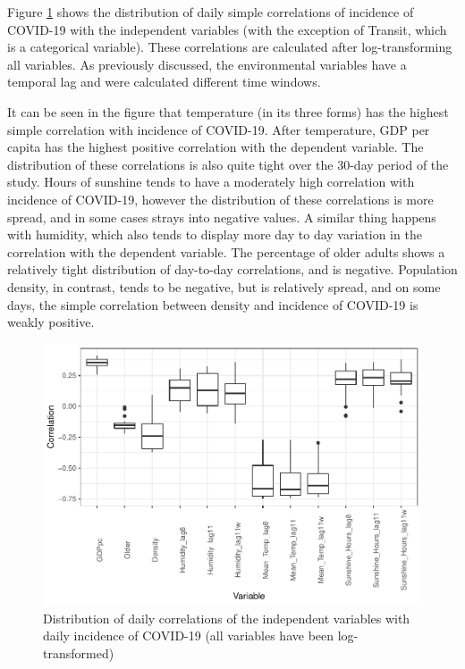 \documentclass[]{elsarticle} %
\makeatletter
\def\maxwidth{\ifdim\Gin@nat@width>\linewidth\linewidth
\else\Gin@nat@width\fi}
\let\Oldincludegraphics\includegraphics
\renewcommand{\includegraphics}[1]{\Oldincludegraphics[width=\maxwidth]{#1}}
\makeatother
\begin{document}
Figure \ref{fig:daily-correlations} shows the distribution of daily
simple correlations of incidence of COVID-19 with the independent
variables (with the exception of Transit, which is a categorical
variable). These correlations are calculated after log-transforming all
variables. As previously discussed, the environmental variables have a
temporal lag and were calculated different time windows.

It can be seen in the figure that temperature (in its three forms) has
the highest simple correlation with incidence of COVID-19. After
temperature, GDP per capita has the highest positive correlation with
the dependent variable. The distribution of these correlations is also
quite tight over the 30-day period of the study. Hours of sunshine tends
to have a moderately high correlation with incidence of COVID-19,
however the distribution of these correlations is more spread, and in
some cases strays into negative values. A similar thing happens with
humidity, which also tends to display more day to day variation in the
correlation with the dependent variable. The percentage of older adults
shows a relatively tight distribution of day-to-day correlations, and is
negative. Population density, in contrast, tends to be negative, but is
relatively spread, and on some days, the simple correlation between
density and incidence of COVID-19 is weakly positive.

\begin{figure}
\centering
\includegraphics{Environmental-Correlates-of-COVID19-Spain_files/figure-latex/daily-correlations-1.pdf}
\caption{\label{fig:daily-correlations}Distribution of daily
correlations of the independent variables with daily incidence of
COVID-19 (all variables have been log-transformed)}
\end{figure}
\end{document}
